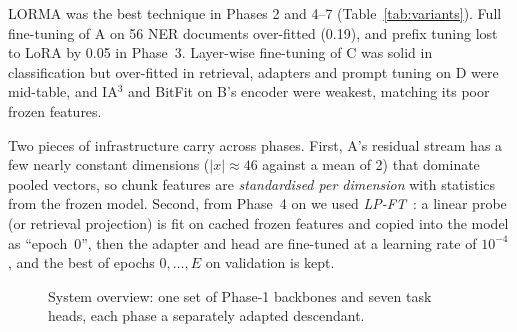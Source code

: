 \documentclass[11pt, oneside]{article}
\newcommand{\A}{\textsf{A}}\newcommand{\B}{\textsf{B}}\newcommand{\C}{\textsf{C}}\newcommand{\D}{\textsf{D}}
\begin{document}
LORMA was the best technique in Phases 2 and 4--7 (Table~\ref{tab:variants}). Full fine-tuning of \A{} on 56 NER documents over-fitted (0.19), and prefix tuning lost to LoRA by 0.05 in Phase~3. Layer-wise fine-tuning of \C{} was solid in classification but over-fitted in retrieval, adapters and prompt tuning on \D{} were mid-table, and IA$^3$ and BitFit on \B's encoder were weakest, matching its poor frozen features.

Two pieces of infrastructure carry across phases. First, \A's residual stream has a few nearly constant dimensions ($|x|\approx46$ against a mean of 2) that dominate pooled vectors, so chunk features are \emph{standardised per dimension} with statistics from the frozen model. Second, from Phase~4 on we used \emph{LP-FT}~\cite{kumar2022lpft}: a linear probe (or retrieval projection) is fit on cached frozen features and copied into the model as ``epoch~0'', then the adapter and head are fine-tuned at a learning rate of $10^{-4}$, and the best of epochs $0,\dots,E$ on validation is kept.

\begin{figure}[t]\centering\small
{}
\caption{System overview: one set of Phase-1 backbones and seven task heads, each phase a separately adapted descendant.}\label{fig:system}
\end{figure}
\end{document}
